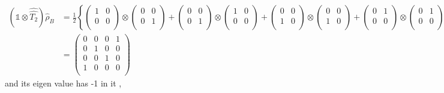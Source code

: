 \begin{equation}
\begin{split}
(\mathds{1}\otimes \hat{\hat{T _{2}}})\hat{\rho }_{B }&=\frac{1}{2}\left\{\begin{pmatrix} 
1&0\\
0&0\\
\end{pmatrix} 
\otimes \begin{pmatrix} 
0&0\\
0&1\\
\end{pmatrix} 
+\begin{pmatrix} 
0&0\\
0&1\\
\end{pmatrix} 
\otimes \begin{pmatrix} 
1&0\\
0&0\\
\end{pmatrix} 
+\begin{pmatrix} 
0&0\\
1&0\\
\end{pmatrix} 
\otimes \begin{pmatrix} 
0&0\\
1&0\\
\end{pmatrix} 
+\begin{pmatrix} 
0&1\\
0&0\\
\end{pmatrix} 
\otimes \begin{pmatrix} 
0&1\\
0&0\\
\end{pmatrix} 
\right\}\\
&=\begin{pmatrix} 
0&0&0&1\\
0&1&0&0\\
0&0&1&0\\
1&0&0&0\\
\end{pmatrix} 
\end{split}
\end{equation}
 and its eigen value has -1 in it , 
